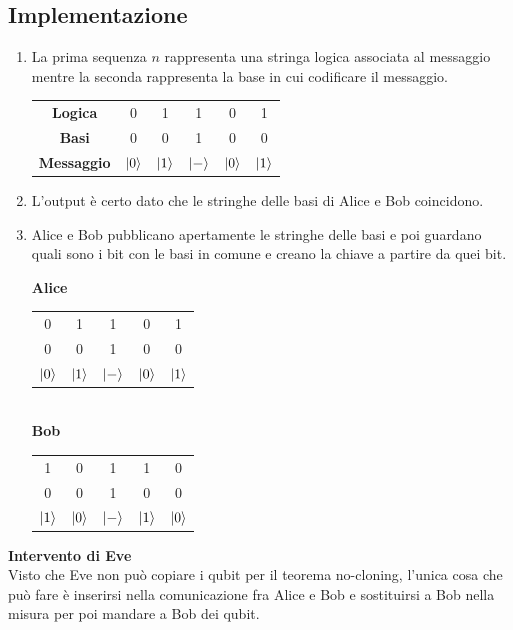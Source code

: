 \documentclass[12pt, a4paper]{report}
\begin{document}
\subsection{Implementazione}
\begin{enumerate}
    \item La prima sequenza $n$ rappresenta una stringa logica associata al messaggio mentre la seconda rappresenta la base in cui codificare il messaggio. 
    \begin{center}
        \begin{tabular}{c c c c c c}
            \textbf{Logica} & 0 & 1 & 1 & 0 & 1  \\
            \textbf{Basi} & 0 & 0 & 1 & 0 & 0  \\
            \textbf{Messaggio} & $| 0 \rangle$ & $| 1 \rangle$ & $| - \rangle$ & $| 0 \rangle$ & $| 1 \rangle$  \\
        \end{tabular}
    \end{center}
    \item L'output è certo dato che le stringhe delle basi di Alice e Bob coincidono.
    \item Alice e Bob pubblicano apertamente le stringhe delle basi e poi guardano quali sono i bit con le basi in comune e creano la chiave a partire da quei bit.
    \begin{center}
        \textbf{Alice}
        \begin{tabular}{c c c c c}
            0 & 1 & 1 & 0 & 1  \\
            0 & 0 & 1 & 0 & 0  \\
            $| 0 \rangle$ & $| 1 \rangle$ & $| - \rangle$ & $| 0 \rangle$ & $| 1 \rangle$  \\
        \end{tabular}\\
        \vspace{0.5em}
        \textbf{Bob}
        \begin{tabular}{c c c c c}
            1 & 0 & 1 & 1 & 0  \\
            0 & 0 & 1 & 0 & 0  \\
            $| 1 \rangle$ & $| 0 \rangle$ & $| - \rangle$ & $| 1 \rangle$ & $| 0 \rangle$  \\
        \end{tabular}
    \end{center}
\end{enumerate}
\textbf{Intervento di Eve}\\
Visto che Eve non può copiare i qubit per il teorema no-cloning, l'unica cosa che può  fare è inserirsi nella comunicazione fra Alice e  Bob e sostituirsi a Bob nella misura per poi mandare a Bob dei qubit.
\end{document}
